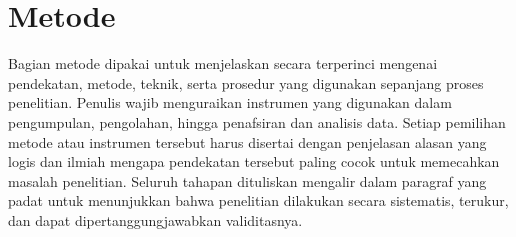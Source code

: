 %
%
%
\chapter{Metode}


Bagian metode dipakai untuk menjelaskan secara terperinci mengenai pendekatan, metode, teknik, serta prosedur yang digunakan sepanjang proses penelitian. Penulis wajib menguraikan instrumen yang digunakan dalam pengumpulan, pengolahan, hingga penafsiran dan analisis data. Setiap pemilihan metode atau instrumen tersebut harus disertai dengan penjelasan alasan yang logis dan ilmiah mengapa pendekatan tersebut paling cocok untuk memecahkan masalah penelitian. Seluruh tahapan dituliskan mengalir dalam paragraf yang padat untuk menunjukkan bahwa penelitian dilakukan secara sistematis, terukur, dan dapat dipertanggungjawabkan validitasnya.
